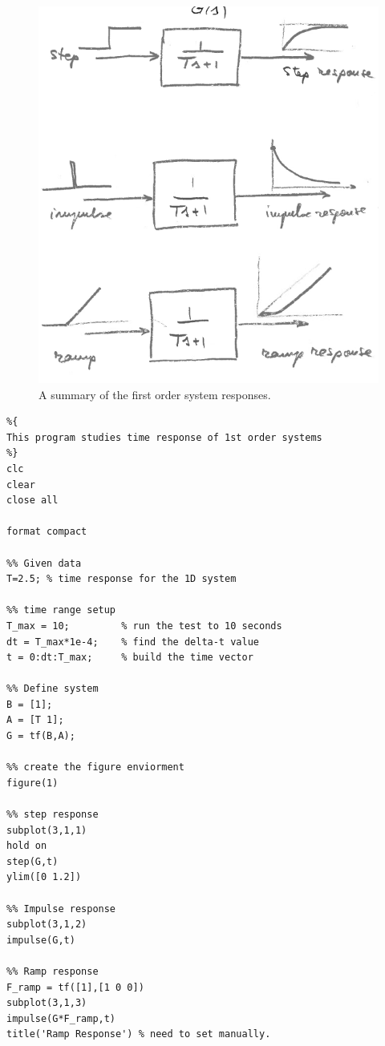 \documentclass[12pt,letter]{article}
\begin{document}
\begin{figure}[H]
	\centering
	\includegraphics[width=4.5in]{../figures/Summary_of_first_order_system_response}
	\caption{A summary of the first order system responses.}
\end{figure}


\lstset{linewidth=5.8in}
\begin{minipage}{1\textwidth}
  \begin{center}
\begin{lstlisting}
%{
This program studies time response of 1st order systems
%}
clc
clear
close all

format compact

%% Given data
T=2.5; % time response for the 1D system

%% time range setup
T_max = 10;         % run the test to 10 seconds
dt = T_max*1e-4;    % find the delta-t value 
t = 0:dt:T_max;     % build the time vector

%% Define system
B = [1];
A = [T 1];
G = tf(B,A); 

%% create the figure enviorment
figure(1)

%% step response 
subplot(3,1,1)
hold on
step(G,t)
ylim([0 1.2])

%% Impulse response
subplot(3,1,2)
impulse(G,t)

%% Ramp response
F_ramp = tf([1],[1 0 0])
subplot(3,1,3)
impulse(G*F_ramp,t)
title('Ramp Response') % need to set manually. 
\end{lstlisting}
  \end{center}
\end{minipage}
\end{document}
